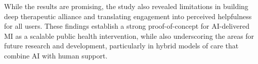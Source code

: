 While the results are promising, the study also revealed limitations in building deep therapeutic alliance and translating engagement into perceived helpfulness for all users. These findings establish a strong proof-of-concept for AI-delivered MI as a scalable public health intervention, while also underscoring the areas for future research and development, particularly in hybrid models of care that combine AI with human support.